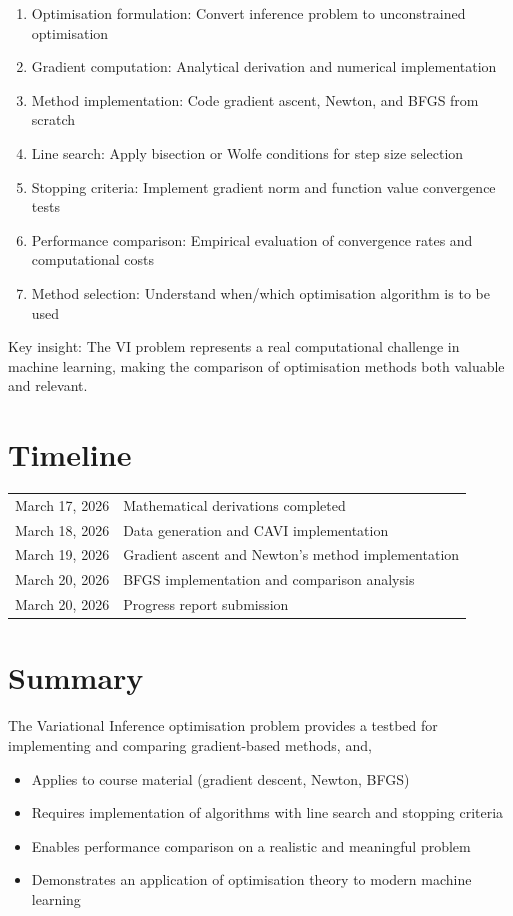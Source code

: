 \documentclass[11pt]{article}
\begin{document}
\begin{enumerate}[leftmargin=*]
\item Optimisation formulation: Convert inference problem to unconstrained optimisation
\item Gradient computation: Analytical derivation and numerical implementation
\item Method implementation: Code gradient ascent, Newton, and BFGS from scratch
\item Line search: Apply bisection or Wolfe conditions for step size selection
\item Stopping criteria: Implement gradient norm and function value convergence tests
\item Performance comparison: Empirical evaluation of convergence rates and computational costs
\item Method selection: Understand when/which  optimisation algorithm is to be used
\end{enumerate}

Key insight: The VI problem represents a real computational challenge in machine learning, making the comparison of optimisation methods both  valuable and  relevant.

\section*{Timeline}

\begin{tabular}{ll}
March 17, 2026 & Mathematical derivations completed \\
March 18, 2026 & Data generation and CAVI implementation \\
March 19, 2026 & Gradient ascent and Newton's method implementation \\
March 20, 2026 & BFGS implementation and comparison analysis \\
March 20, 2026 & Progress report submission \\
\end{tabular}

\section*{Summary}

The Variational Inference optimisation problem provides a testbed for implementing and comparing gradient-based methods, and, 

\begin{itemize}
\item Applies to course material (gradient descent, Newton, BFGS)
\item Requires implementation of algorithms with line search and stopping criteria
\item Enables performance comparison on a realistic and meaningful problem
\item Demonstrates an application of optimisation theory to modern machine learning
\end{itemize}
\end{document}
